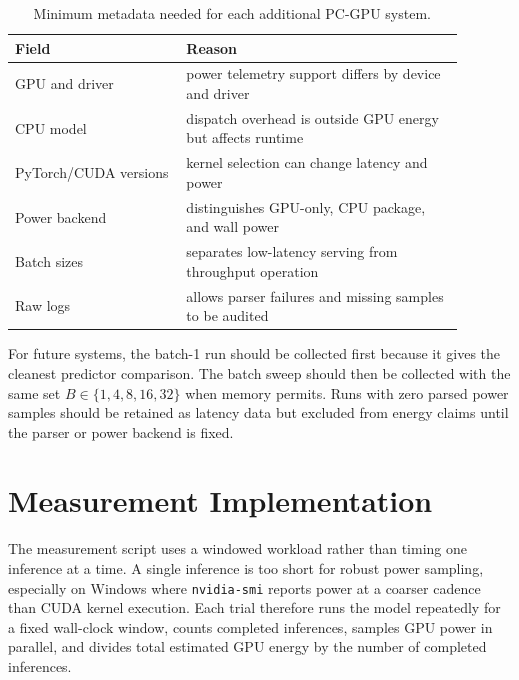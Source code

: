 \documentclass[conference]{IEEEtran}
\begin{document}
\begin{table}[t]
\centering
\caption{Minimum metadata needed for each additional PC-GPU system.}
\label{tab:metadata}
\scriptsize
\begin{tabular}{@{}L{0.34\linewidth}L{0.55\linewidth}@{}}
\toprule
Field & Reason\\
\midrule
GPU and driver & power telemetry support differs by device and driver\\
CPU model & dispatch overhead is outside GPU energy but affects runtime\\
PyTorch/CUDA versions & kernel selection can change latency and power\\
Power backend & distinguishes GPU-only, CPU package, and wall power\\
Batch sizes & separates low-latency serving from throughput operation\\
Raw logs & allows parser failures and missing samples to be audited\\
\bottomrule
\end{tabular}
\end{table}

For future systems, the batch-1 run should be collected first because it gives
the cleanest predictor comparison. The batch sweep should then be collected
with the same set $B\in\{1,4,8,16,32\}$ when memory permits. Runs with zero
parsed power samples should be retained as latency data but excluded from
energy claims until the parser or power backend is fixed.

\section{Measurement Implementation}

The measurement script uses a windowed workload rather than timing one
inference at a time. A single inference is too short for robust power sampling,
especially on Windows where \texttt{nvidia-smi} reports power at a coarser
cadence than CUDA kernel execution. Each trial therefore runs the model
repeatedly for a fixed wall-clock window, counts completed inferences, samples
GPU power in parallel, and divides total estimated GPU energy by the number of
completed inferences.
\end{document}
